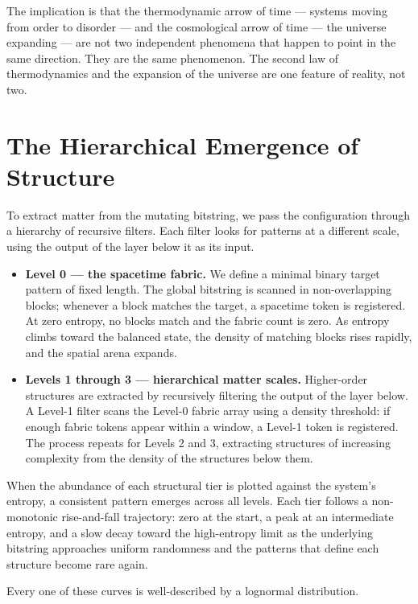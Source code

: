 The implication is that the thermodynamic arrow of time --- systems
moving from order to disorder --- and the cosmological arrow of time ---
the universe expanding --- are not two independent phenomena that happen
to point in the same direction. They are the same phenomenon. The second
law of thermodynamics and the expansion of the universe are one feature
of reality, not two.

\section{The Hierarchical Emergence of Structure}

To extract matter from the mutating bitstring, we pass the configuration
through a hierarchy of recursive filters. Each filter looks for patterns
at a different scale, using the output of the layer below it as its
input.

\begin{itemize}
    \item \textbf{Level 0 --- the spacetime fabric.} We define a minimal
    binary target pattern of fixed length. The global bitstring is
    scanned in non-overlapping blocks; whenever a block matches the
    target, a spacetime token is registered. At zero entropy, no blocks
    match and the fabric count is zero. As entropy climbs toward the
    balanced state, the density of matching blocks rises rapidly, and
    the spatial arena expands.

    \item \textbf{Levels 1 through 3 --- hierarchical matter scales.}
    Higher-order structures are extracted by recursively filtering the
    output of the layer below. A Level-1 filter scans the Level-0 fabric
    array using a density threshold: if enough fabric tokens appear
    within a window, a Level-1 token is registered. The process repeats
    for Levels 2 and 3, extracting structures of increasing complexity
    from the density of the structures below them.
\end{itemize}

When the abundance of each structural tier is plotted against the
system's entropy, a consistent pattern emerges across all levels. Each
tier follows a non-monotonic rise-and-fall trajectory: zero at the
start, a peak at an intermediate entropy, and a slow decay toward the
high-entropy limit as the underlying bitstring approaches uniform
randomness and the patterns that define each structure become rare again.

Every one of these curves is well-described by a lognormal distribution.

